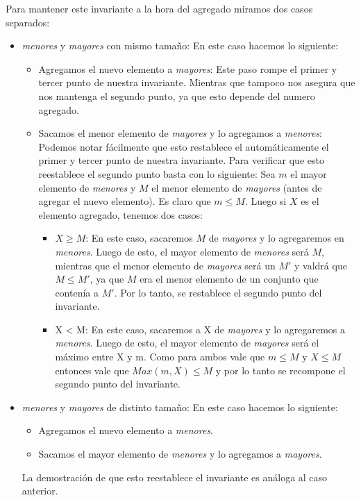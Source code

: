 Para mantener este invariante a la hora del agregado miramos dos casos separados:
\begin{itemize}
\item \textit{menores} y \textit{mayores} con mismo tama\~no: En este caso hacemos lo siguiente:
	\begin{itemize}	
	\item Agregamos el nuevo elemento a \textit{mayores}: Este paso rompe el primer y tercer punto de nuestra invariante. Mientras que tampoco nos asegura que nos mantenga el segundo punto, ya que esto depende del numero agregado.
	\item Sacamos el menor elemento de \textit{mayores} y lo agregamos a \textit{menores}: Podemos notar f\'acilmente que esto restablece el autom\'aticamente el primer y tercer punto de nuestra invariante. Para verificar que esto reestablece el segundo punto basta con lo siguiente:
	Sea $m$ el mayor elemento de \textit{menores} y $M$ el menor elemento de \textit{mayores} (antes de agregar el nuevo elemento). Es claro que $m \le M$. Luego si $X$ es el elemento agregado, tenemos dos casos:
		\begin{itemize}	
		\item $X \ge M$: En este caso, sacaremos $M$ de \textit{mayores} y lo agregaremos en \textit{menores}. Luego de esto, el mayor elemento de \textit{menores} ser\'a $M$, mientras que el menor elemento de \textit{mayores} ser\'a un $M'$ y valdr\'a que $M \le M'$, ya que $M$ era el menor elemento de un conjunto que conten\'ia a $M'$. Por lo tanto, se restablece el segundo punto del invariante.
		\item X < M: En este caso, sacaremos a X de \textit{mayores} y lo agregaremos a \textit{menores}. Luego de esto, el mayor elemento de \textit{mayores} ser\'a el m\'aximo entre X y m. Como para ambos vale que $m \le M$ y $X \le M$ entonces vale que $Max(m, X) \le M$ y por lo tanto se recompone el segundo punto del invariante.
		\end{itemize}
	\end{itemize}
\end{itemize}
\begin{itemize}
\item \textit{menores} y \textit{mayores} de distinto tama\~no: En este caso hacemos lo siguiente:
	\begin{itemize}
	\item Agregamos el nuevo elemento a \textit{menores}.
	\item Sacamos el mayor elemento de \textit{menores} y lo agregamos a \textit{mayores}.
	\end{itemize}
	La demostraci\'on de que esto reestablece el invariante es an\'aloga al caso anterior.

\end{itemize}

